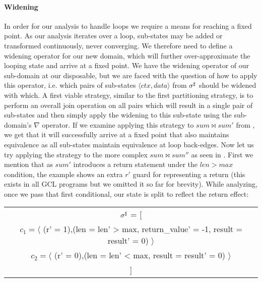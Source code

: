 \paragraph{Widening}
In order for our analysis to handle loops we require a means for reaching a fixed point. As our analysis iterates over a loop, sub-states may be added or transformed continuously, never converging. We therefore need to define a widening operator for our new domain, which will further over-approximate the looping state and arrive at a fixed point. We have the widening operator of our sub-domain at our disposable, but we are faced with the question of how to apply this operator, i.e. which pairs of sub-states $\langle ctx , data \rangle$ from $\sigma^\sharp$ should be widened with which. A first viable strategy, similar to the first partitioning strategy, is to perform an overall join operation on all pairs which will result in a single pair of sub-states and then simply apply the widening to this sub-state using the sub-domain's $\nabla$ operator. If we examine applying this strategy to $sum \bowtie sum'$ from , we get that it will successfully arrive at a fixed point that also maintains equivalence as all sub-states maintain equivalence at loop back-edges. Now let us try applying the strategy to the more complex $sum \bowtie sum''$ as seen in . First we mention that as $sum'$ introduces a return statement under the $len > max$ condition, the example shows an extra $r'$ guard for representing a return (this exists in all GCL programs but we omitted it so far for brevity). While analyzing, once we pass that first conditional, our state is split to reflect the return effect:
\\
\begin{tabular}{c}
$\sigma^\sharp$ = [
\\
$c_1 = \langle$ (r' = 1),(len = len' > max, return\_value' = -1, result = result' = 0) $\rangle$
\\
$c_2 = \langle$ (r' = 0),(len = len' < max, result = result' = 0) $\rangle$
\\
]
\end{tabular}
\\
